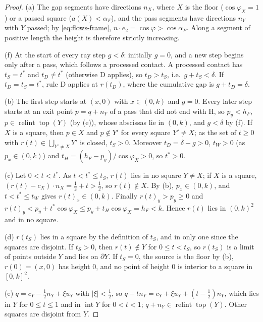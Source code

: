 \documentclass[11pt]{amsart}
\newcommand{\relint}{\operatorname{relint}}
\newcommand{\Top}{\operatorname{top}}
\theoremstyle{definition}
\theoremstyle{remark}
\numberwithin{equation}{section}
\begin{document}
\begin{proof}
(a) The gap segments have directions $n_X$, where $X$ is the floor ($\cos\varphi_X=1$) or a passed square
($a(X)<\alpha_F$), and the pass segments have directions $n_Y$ with $Y$ passed; by \eqref{eq:flows-frame},
$n\cdot e_2=\cos\varphi>\cos\alpha_F$. Along a segment of positive length the height is therefore strictly increasing.

(f) At the start of every ray step $g<\delta$: initially $g=0$, and a new step begins only after a pass, which
follows a processed contact. A processed contact has $t_S=t^*$ and $t_D\ne t^*$ (otherwise D applies), so
$t_D>t_S$, i.e.\ $g+t_S<\delta$. If $t_D=t_S=t^*$, rule D applies at $r(t_D)$, where the cumulative gap is $g+t_D=\delta$.

(b) The first step starts at $(x,0)$ with $x\in(0,k)$ and $g=0$. Every later step starts at an exit point $p=q+n_Y$
of a pass that did not end with H, so $p_y<h_F$, $p\in\relint\Top(Y)$ (by (e)), whose abscissas lie in $(0,k)$, and
$g<\delta$ by (f). If $X$ is a square, then $p\in X$ and $p\notin Y'$ for every square $Y'\ne X$; as the set of $t\ge0$
with $r(t)\in\bigcup_{Y'\ne X}Y'$ is closed, $t_S>0$. Moreover $t_D=\delta-g>0$, $t_W>0$ (as $p_x\in(0,k)$) and
$t_H=(h_F-p_y)/\cos\varphi_X>0$, so $t^*>0$.

(c) Let $0<t<t^*$. As $t<t^*\le t_S$, $r(t)$ lies in no square $Y\ne X$; if $X$ is a square,
$(r(t)-c_X)\cdot n_X=\frac12+t>\frac12$, so $r(t)\notin X$. By (b), $p_x\in(0,k)$, and $t<t^*\le t_W$ gives
$r(t)_x\in(0,k)$. Finally $r(t)_y>p_y\ge0$ and $r(t)_y<p_y+t^*\cos\varphi_X\le p_y+t_H\cos\varphi_X=h_F<k$. Hence $r(t)$
lies in $(0,k)^2$ and in no square.

(d) $r(t_S)$ lies in a square by the definition of $t_S$, and in only one since the squares are disjoint. If $t_S>0$,
then $r(t)\notin Y$ for $0\le t<t_S$, so $r(t_S)$ is a limit of points outside $Y$ and lies on $\partial Y$. If $t_S=0$,
the source is the floor by (b), $r(0)=(x,0)$ has height $0$, and no point of height $0$ is interior to a square in
$[0,k]^2$.

(e) $q=c_Y-\frac12n_Y+\xi u_Y$ with $|\xi|<\frac12$, so $q+tn_Y=c_Y+\xi u_Y+(t-\frac12)n_Y$, which lies in $Y$ for
$0\le t\le1$ and in $\operatorname{int}Y$ for $0<t<1$; $q+n_Y\in\relint\Top(Y)$. Other squares are disjoint from $Y$.


\end{proof}
\end{document}
